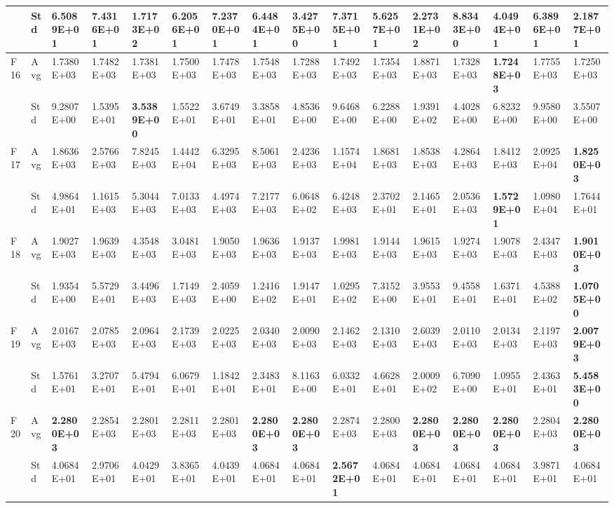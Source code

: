 \documentclass{article} %
\begin{document}
\begin{tabular}{|p{0.3in}|p{0.3in}|p{0.3in}|p{0.3in}|p{0.3in}|p{0.3in}|p{0.3in}|p{0.3in}|p{0.3in}|p{0.3in}|p{0.3in}|p{0.3in}|p{0.3in}|p{0.3in}|p{0.3in}|p{0.5in}|}
 & Std & 6.5089E+01 & 7.4316E+01 & 1.7173E+02 & 6.2056E+01 & 7.2370E+01 & 6.4484E+01 & \textbf{3.4275E+00} & 7.3715E+01 & 5.6257E+01 & 2.2731E+02 & 8.8343E+00 & 4.0494E+01 & 6.3896E+01 & 2.1877E+01 \\ \hline 
F16 & Avg & 1.7380E+03 & 1.7482E+03 & 1.7381E+03 & 1.7500E+03 & 1.7478E+03 & 1.7548E+03 & 1.7288E+03 & 1.7492E+03 & 1.7354E+03 & 1.8871E+03 & 1.7328E+03 & \textbf{1.7248E+03} & 1.7755E+03 & 1.7250E+03 \\ \hline 
 & Std & 9.2807E+00 & 1.5395E+01 & \textbf{3.5389E+00} & 1.5522E+01 & 3.6749E+01 & 3.3858E+01 & 4.8536E+00 & 9.6468E+00 & 6.2288E+00 & 1.9391E+02 & 4.4028E+00 & 6.8232E+00 & 9.9580E+00 & 3.5507E+00 \\ \hline 
F17 & Avg & 1.8636E+03 & 2.5766E+03 & 7.8245E+03 & 1.4442E+04 & 6.3295E+03 & 8.5061E+03 & 2.4236E+03 & 1.1574E+04 & 1.8681E+03 & 1.8538E+03 & 4.2864E+03 & 1.8412E+03 & 2.0925E+04 & \textbf{1.8250E+03} \\ \hline 
 & Std & 4.9864E+01 & 1.1615E+03 & 5.3044E+03 & 7.0133E+03 & 4.4974E+03 & 7.2177E+03 & 6.0648E+02 & 6.4248E+03 & 2.3702E+01 & 2.1465E+01 & 2.0536E+03 & \textbf{1.5729E+01} & 1.0980E+04 & 1.7644E+01 \\ \hline 
F18 & Avg & 1.9027E+03 & 1.9639E+03 & 4.3548E+03 & 3.0481E+03 & 1.9050E+03 & 1.9636E+03 & 1.9137E+03 & 1.9981E+03 & 1.9144E+03 & 1.9615E+03 & 1.9274E+03 & 1.9078E+03 & 2.4347E+03 & \textbf{1.9010E+03} \\ \hline 
 & Std & 1.9354E+00 & 5.5729E+01 & 3.4496E+03 & 1.7149E+03 & 2.4059E+00 & 1.2416E+02 & 1.9147E+01 & 1.0295E+02 & 7.3152E+00 & 3.9553E+01 & 9.4558E+01 & 1.6371E+01 & 4.5388E+02 & \textbf{1.0705E+00} \\ \hline 
F19 & Avg & 2.0167E+03 & 2.0785E+03 & 2.0964E+03 & 2.1739E+03 & 2.0225E+03 & 2.0340E+03 & 2.0090E+03 & 2.1462E+03 & 2.1310E+03 & 2.6039E+03 & 2.0110E+03 & 2.0134E+03 & 2.1197E+03 & \textbf{2.0079E+03} \\ \hline 
 & Std & 1.5761E+01 & 3.2707E+01 & 5.4794E+01 & 6.0679E+01 & 1.1842E+01 & 2.3483E+01 & 8.1163E+00 & 6.0332E+01 & 4.6628E+01 & 2.0009E+02 & 6.7090E+00 & 1.0955E+01 & 2.4363E+01 & \textbf{5.4583E+00} \\ \hline 
F20 & Avg & \textbf{2.2800E+03} & 2.2854E+03 & 2.2801E+03 & 2.2811E+03 & 2.2801E+03 & \textbf{2.2800E+03} & \textbf{2.2800E+03} & 2.2874E+03 & 2.2800E+03 & \textbf{2.2800E+03} & \textbf{2.2800E+03} & \textbf{2.2800E+03} & 2.2804E+03 & \textbf{2.2800E+03} \\ \hline 
 & Std & 4.0684E+01 & 2.9706E+01 & 4.0429E+01 & 3.8365E+01 & 4.0439E+01 & 4.0684E+01 & 4.0684E+01 & \textbf{2.5672E+01} & 4.0684E+01 & 4.0684E+01 & 4.0684E+01 & 4.0684E+01 & 3.9871E+01 & 4.0684E+01 \\ \hline 

\end{tabular}
\end{document}
